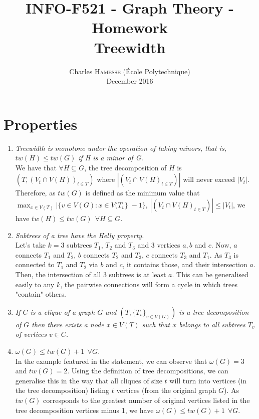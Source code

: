 \documentclass[a4paper,10pt]{article}
\title{INFO-F521 - Graph Theory - Homework\\Treewidth}
\date{\vspace{-7ex}
Charles \textsc{Hamesse} (École Polytechnique)\\
\vspace{2ex}December 2016}
\begin{document}
\maketitle
\section{Properties}

\begin{enumerate}
	\item \textit{Treewidth is monotone under the operation of taking minors, that is, $tw(H) \leq tw(G)$ if H is a minor of G.\\}
		We have that $\forall H \subseteq G$, the tree decomposition of $H$ is $(T, (V_t \cap V(H))_{t \in T})$ where $|(V_t \cap V(H)_{t \in T})|$ will never exceed $|V_t|$.
		Therefore, as $tw(G)$ is defined as the minimum value that $\max_{x \in V(T)} | \{ v \in V(G) : x \in V(T_v \} | - 1 \}$, $|(V_t \cap V(H)_{t \in T})| \leq |V_t|$, we have $tw(H) \leq tw(G) ~~\forall H \subseteq G$.
	\item \textit{Subtrees of a tree have the Helly property.\\}
	Let's take $k = 3$ subtrees $T_1$, $T_2$ and $T_3$ and 3 vertices $a,b$ and $c$. Now, $a$ connects $T_1$ and $T_2$, $b$ connects $T_2$ and $T_3$, $c$ connects $T_3$ and $T_1$. As $T_3$ is connected to $T_1$ and $T_2$ via $b$ and $c$, it contains those, and their intersection $a$. Then, the intersection of all 3 subtrees is at least $a$. This can be generalised easily to any $k$, the pairwise connections will form a cycle in which trees "contain" others.
	\item \textit{If $C$ is a clique of a graph $G$ and $(T, \{T_v\}_{v \in V(G)})$ is a tree decomposition of $G$ then there exists a node $x \in V (T)$ such that $x$ belongs to all subtrees $T_v$ of vertices $v \in C$.\\}
	\item \textit{$\omega(G) \leq tw(G) + 1~~ \forall G$.\\}
	In the example featured in the statement, we can observe that $\omega(G) = 3$ and $tw(G) = 2$. Using the definition of tree decompositions, we can generalise this in the way that all cliques of size $t$ will turn into vertices (in the tree decomposition) listing $t$ vertices (from the original graph $G$). As $tw(G)$ corresponds to the greatest number of original vertices listed in the tree decomposition vertices minus 1, we have $\omega(G) \leq tw(G) + 1~~ \forall G$.

\end{enumerate}
\end{document}
